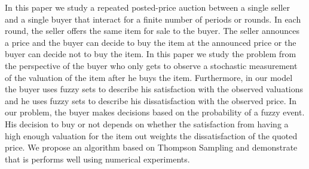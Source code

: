 
In this paper we study  a repeated posted-price auction between a single seller and a single buyer that interact for a finite number of periods or rounds. In each round, the seller offers the same item for sale to the buyer. The seller announces a price and the buyer can decide to buy the item at the announced price or the buyer can decide not to buy the item. In this paper we study the problem from the perspective of the buyer who only gets to observe a stochastic measurement of the valuation of the item after he buys the item. Furthermore, in our model the buyer uses fuzzy sets to describe his satisfaction with the observed valuations and he uses fuzzy sets to describe his dissatisfaction with the observed price. In our problem, the buyer makes decisions based on the probability of a fuzzy event. His decision to buy or not depends on whether the satisfaction from having a high enough valuation for the item out weights the dissatisfaction of the quoted price.  We propose an algorithm based on Thompson Sampling and demonstrate that is performs well using numerical experiments. 

